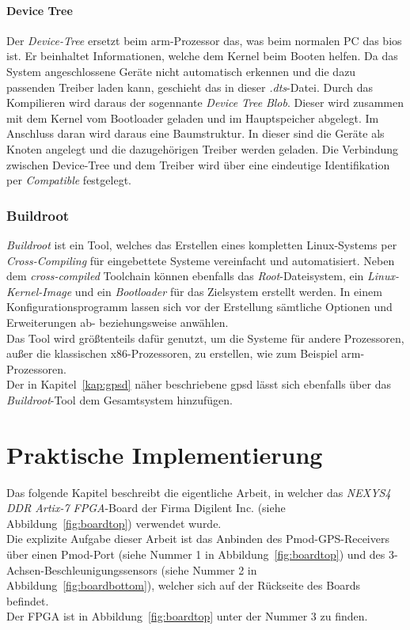 \subsubsection{Device Tree}\label{kap:devicetree}


Der \emph{Device-Tree} ersetzt beim \ac{arm}-Prozessor das, was beim normalen PC das \ac{bios} ist. Er beinhaltet
Informationen, welche dem Kernel beim Booten helfen. Da das System angeschlossene Geräte nicht automatisch erkennen
und die dazu passenden Treiber laden kann, geschieht das in dieser \emph{.dts}-Datei. Durch das Kompilieren wird daraus
der sogennante \emph{Device} \emph{Tree} \emph{Blob}. Dieser wird zusammen mit dem Kernel vom Bootloader geladen und im
Hauptspeicher abgelegt. Im Anschluss daran wird daraus eine Baumstruktur. In dieser sind die Geräte als Knoten angelegt
und die dazugehörigen Treiber werden geladen. Die Verbindung zwischen Device-Tree und dem Treiber wird über eine
eindeutige Identifikation per \emph{Compatible} festgelegt.


\subsection{Buildroot}\label{kap:buildroot}

\emph{Buildroot} ist ein Tool, welches das Erstellen eines kompletten Linux-Systems per
\emph{Cross-Compiling} für eingebettete Systeme vereinfacht und automatisiert.  Neben dem
\emph{cross-compiled} Toolchain können ebenfalls das \emph{Root}-Dateisystem, ein \emph{Linux-Kernel-Image}
und ein \emph{Bootloader} für das Zielsystem erstellt werden.  In einem Konfigurationsprogramm lassen sich vor der
Erstellung sämtliche Optionen und Erweiterungen ab- beziehungsweise anwählen. \\
Das Tool wird größtenteils dafür genutzt, um die Systeme für andere Prozessoren, außer die klassischen x86-Prozessoren,
zu erstellen, wie zum Beispiel \ac{arm}-Prozessoren.\\
Der in Kapitel~\ref{kap:gpsd} näher beschriebene \ac{gpsd} lässt sich ebenfalls
über das \emph{Buildroot}-Tool dem Gesamtsystem hinzufügen.\cite{buildroot}\\



\chapter{Praktische Implementierung}\label{ch:praktischeImplementierung}

Das folgende Kapitel beschreibt die eigentliche Arbeit, in welcher das \emph{NEXYS4 DDR Artix-7 FPGA}-Board
der Firma Digilent Inc. (siehe Abbildung~\ref{fig:boardtop}) verwendet wurde.\\
Die explizite Aufgabe dieser Arbeit ist das Anbinden des Pmod-GPS-Receivers über einen
Pmod-Port (siehe Nummer 1 in Abbildung~\ref{fig:boardtop}) und des 3-Achsen-Beschleunigungssensors
(siehe Nummer 2 in Abbildung~\ref{fig:boardbottom}), welcher sich auf der Rückseite des Boards befindet.\\
Der FPGA ist in Abbildung~\ref{fig:boardtop} unter der Nummer 3 zu finden.\\

